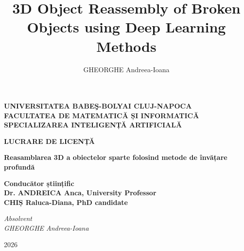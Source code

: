 \documentclass[12pt]{report}
\begin{document}
\title{3D Object Reassembly of Broken Objects using Deep Learning Methods}
\author{GHEORGHE Andreea-Ioana}

\maketitle

\begin{titlepage}
\begin{center}
{\Large\textbf{
UNIVERSITATEA BABEŞ-BOLYAI CLUJ-NAPOCA \\
FACULTATEA DE MATEMATICĂ ȘI INFORMATICĂ \\
SPECIALIZAREA INTELIGENȚĂ ARTIFICIALĂ \\
}}
\end{center}

\vspace{10em}

\begin{center}
{\Huge\textbf{LUCRARE DE LICENȚĂ}}
\end{center}

\vspace{3em}

\begin{center}
{\huge\textbf{Reasamblarea 3D a obiectelor sparte folosind metode de învățare profundă}}
\end{center}

\vspace{10em}

\begin{flushleft}
{\Large\textbf{
Conducător științific \\ Dr. ANDREICA Anca, University Professor \\ CHIȘ Raluca-Diana, PhD candidate
}}
\end{flushleft}

\vspace{3em}

\begin{flushright}
{\Large\textit{
Absolvent\\ GHEORGHE Andreea-Ioana
}}
\end{flushright}

\vfill

\begin{center}
{\Large{2026}}
\end{center}

\end{titlepage}
\end{document}
